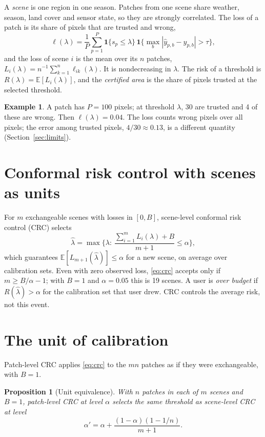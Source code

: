 \documentclass[11pt,a4paper]{article}
\newtheorem{proposition}{Proposition}
\theoremstyle{definition}
\newtheorem{example}{Example}
\theoremstyle{remark}
\newcommand{\E}{\mathbb{E}}
\newcommand{\1}{\mathbf{1}}
\begin{document}
A \emph{scene} is one region in one season. Patches from one scene share weather, season, land cover and sensor state, so they are strongly correlated. The loss of a patch is its share of pixels that are trusted and wrong,
\begin{equation}
\ell(\lambda)=\frac1P\sum_{p=1}^{P}\1\{s_p\le\lambda\}\,\1\Big\{\max_b|\hat y_{p,b}-y_{p,b}|>\tau\Big\},
\end{equation}
and the loss of scene $i$ is the mean over its $n$ patches, $L_i(\lambda)=n^{-1}\sum_{k=1}^{n}\ell_{ik}(\lambda)$. It is nondecreasing in $\lambda$. The risk of a threshold is $R(\lambda)=\E[L_i(\lambda)]$, and the \emph{certified area} is the share of pixels trusted at the selected threshold.

\begin{example}
A patch has $P=100$ pixels; at threshold $\lambda$, 30 are trusted and 4 of these are wrong. Then $\ell(\lambda)=0.04$. The loss counts wrong pixels over all pixels; the error among trusted pixels, $4/30\approx0.13$, is a different quantity (Section~\ref{sec:limits}).
\end{example}

\section{Conformal risk control with scenes as units}

For $m$ exchangeable scenes with losses in $[0,B]$, scene-level conformal risk control (CRC) \cite{crc} selects
\begin{equation}
\hat\lambda=\max\Big\{\lambda:\ \frac{\sum_{i=1}^{m}L_i(\lambda)+B}{m+1}\le\alpha\Big\},
\label{eq:crc}
\end{equation}
which guarantees $\E[L_{m+1}(\hat\lambda)]\le\alpha$ for a new scene, on average over calibration sets. Even with zero observed loss, \eqref{eq:crc} accepts only if $m\ge B/\alpha-1$; with $B=1$ and $\alpha=0.05$ this is 19 scenes. A user is \emph{over budget} if $R(\hat\lambda)>\alpha$ for the calibration set that user drew. CRC controls the average risk, not this event.

\section{The unit of calibration}

Patch-level CRC applies \eqref{eq:crc} to the $mn$ patches as if they were exchangeable, with $B=1$.

\begin{proposition}[Unit equivalence]\label{prop:unit}
With $n$ patches in each of $m$ scenes and $B=1$, patch-level CRC at level $\alpha$ selects the same threshold as scene-level CRC at level
\begin{equation}
\alpha'=\alpha+\frac{(1-\alpha)(1-1/n)}{m+1}.
\label{eq:alphap}
\end{equation}
\end{proposition}
\end{document}
